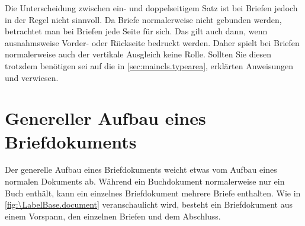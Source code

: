 
Die Unterscheidung zwischen ein- und doppelseitigem Satz ist bei Briefen
jedoch in der Regel nicht sinnvoll. Da Briefe normalerweise nicht gebunden
werden, betrachtet man bei Briefen jede Seite für sich. Das gilt auch dann,
wenn ausnahmsweise Vorder- oder Rückseite bedruckt werden. Daher spielt bei
Briefen normalerweise auch der vertikale Ausgleich keine Rolle. Sollten Sie
diesen trotzdem benötigen
\iffalse%
oder wissen wollen, was das ist, %
\fi%
sei auf die in \autoref{sec:maincls.typearea},
 erklärten Anweisungen
 und
 verwiesen.%
%
\EndIndexGroup


\section{Genereller Aufbau eines Briefdokuments}
\BeginIndexGroup
{}

Der generelle Aufbau eines Briefdokuments weicht etwas vom Aufbau eines
normalen Dokuments ab. Während ein Buchdokument normalerweise nur ein Buch
enthält, kann ein einzelnes Briefdokument mehrere Briefe enthalten.  Wie in
\autoref{fig:\LabelBase.document} veranschaulicht wird, besteht ein
Briefdokument aus einem Vorspann, den einzelnen Briefen und dem Abschluss.


